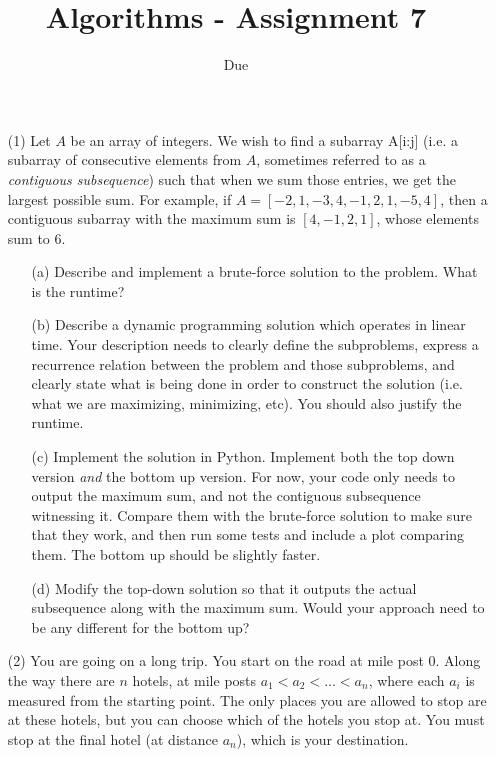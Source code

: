 \documentclass[12pt]{article}
\title{Algorithms - Assignment 7}
\date{Due }
\begin{document}
\maketitle

\begin{enumerate}
    \item[(1)] Let $A$ be an array of integers. We wish to find a subarray A[i:j] (i.e. a subarray of consecutive elements from $A$, sometimes referred to as a 
    \emph{contiguous subsequence}) such that when we sum those entries, we get the largest possible sum. For example, if $A=[-2, 1, -3, 4, -1, 2, 1, -5, 4]$, then a contiguous subarray with the maximum sum is $[4,-1,2,1]$, whose elements sum to $6$.
    \begin{itemize}
        \item[(a)] Describe and implement a brute-force solution to the problem. What is the runtime? 
        \item[(b)] Describe a dynamic programming solution which operates in linear time. Your description needs to clearly define the subproblems, express a recurrence relation between the problem and those subproblems, and clearly state what is being done in order to construct the solution (i.e. what we are maximizing, minimizing, etc). You should also justify the runtime. 
        \item[(c)] Implement the solution in Python. Implement both the top down version \emph{and} the bottom up version. For now, your code only needs to output the maximum sum, and not the contiguous subsequence witnessing it. Compare them with the brute-force solution to make sure that they work, and then run some tests and include a plot comparing them. The bottom up should be slightly faster.
        \item[(d)] Modify the top-down solution so that it outputs the actual subsequence along with the maximum sum. Would your approach need to be any different for the bottom up? 
    \end{itemize}
    \item[(2)] You are going on a long trip. You start on the road at mile post 0. Along the way there are $n$ hotels, at mile posts $a_1 < a_2 < \ldots < a_n$, where each $a_i$ is measured from the starting point. The only places you are allowed to stop are at these hotels, but you can choose which of the hotels you stop at. You must stop at the final hotel (at distance $a_n$), which is your destination.
    

\end{enumerate}
\end{document}
